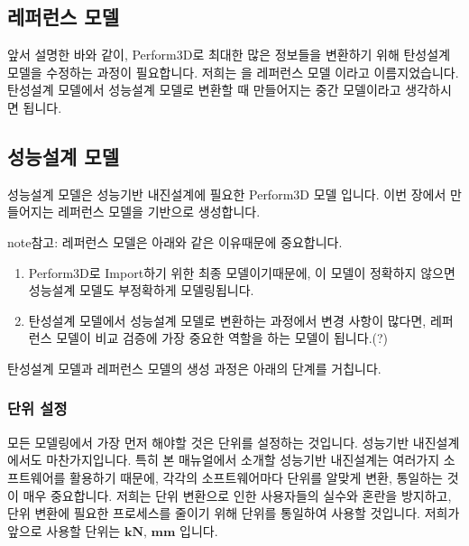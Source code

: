 \documentclass[a4paper,10pt,korean]{sphinxmanual}
\begin{document}
\subsection{레퍼런스 모델}
\label{\detokenize{1_ref_model:id3}}
\sphinxAtStartPar
앞서 설명한 바와 같이, Perform\sphinxhyphen{}3D로 최대한 많은 정보들을 변환하기 위해 탄성설계 모델을 수정하는 과정이 필요합니다.
저희는  을 레퍼런스 모델 이라고 이름지었습니다.
탄성설계 모델에서 성능설계 모델로 변환할 때 만들어지는 중간 모델이라고 생각하시면 됩니다.


\subsection{성능설계 모델}
\label{\detokenize{1_ref_model:id4}}
\sphinxAtStartPar
성능설계 모델은 성능기반 내진설계에 필요한 Perform\sphinxhyphen{}3D 모델 입니다.
이번 장에서 만들어지는 레퍼런스 모델을 기반으로 생성합니다.

\begin{sphinxadmonition}{note}{참고:}
\sphinxAtStartPar
레퍼런스 모델은 아래와 같은 이유때문에 중요합니다.
\begin{enumerate}
%
\item {} 
\sphinxAtStartPar
Perform\sphinxhyphen{}3D로 Import하기 위한 최종 모델이기때문에, 이 모델이 정확하지 않으면 성능설계 모델도 부정확하게 모델링됩니다.

\item {} 
\sphinxAtStartPar
탄성설계 모델에서 성능설계 모델로 변환하는 과정에서 변경 사항이 많다면, 레퍼런스 모델이 비교 검증에 가장 중요한 역할을 하는 모델이 됩니다.(?)

\end{enumerate}
\end{sphinxadmonition}

\sphinxAtStartPar
탄성설계 모델과 레퍼런스 모델의 생성 과정은 아래의 단계를 거칩니다.

\sphinxstepscope


\subsubsection{단위 설정}
\label{\detokenize{1_unit_setting:id1}}\label{\detokenize{1_unit_setting::doc}}
\sphinxAtStartPar
모든 모델링에서 가장 먼저 해야할 것은 단위를 설정하는 것입니다. 성능기반 내진설계에서도 마찬가지입니다.
특히 본 매뉴얼에서 소개할 성능기반 내진설계는 여러가지 소프트웨어를 활용하기 때문에, 각각의 소프트웨어마다 단위를 알맞게 변환, 통일하는 것이
매우 중요합니다. 저희는 단위 변환으로 인한 사용자들의 실수와 혼란을 방지하고, 단위 변환에 필요한 프로세스를 줄이기 위해 단위를 통일하여 사용할 것입니다.
저희가 앞으로 사용할 단위는 \(\textbf{kN, mm}\) 입니다.
\end{document}
